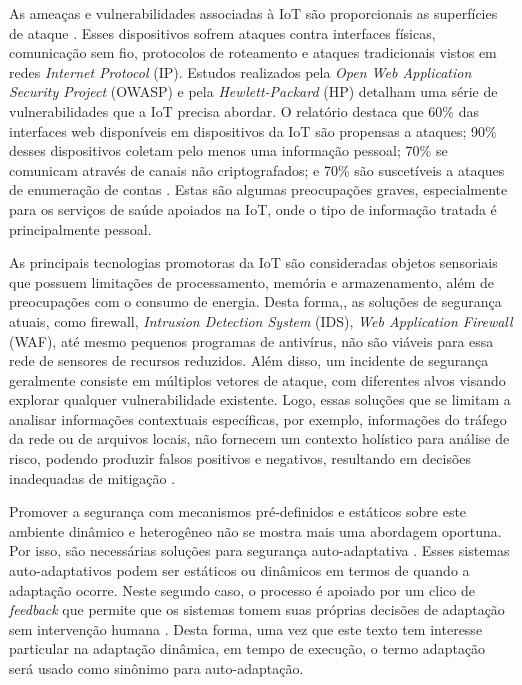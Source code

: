 \documentclass[tid,table]{texufpel} %
\newcommand {\AY} {\todo[inline, color=green]} %
\begin{document}
As ameaças e vulnerabilidades associadas à IoT são proporcionais as superfícies de ataque \cite{sans17}. Esses dispositivos sofrem ataques contra interfaces físicas, comunicação sem fio, protocolos de roteamento e ataques tradicionais vistos em redes \textit{Internet Protocol} (IP). Estudos realizados pela \textit{Open Web Application Security Project } (OWASP) e pela \textit{Hewlett-Packard} (HP) detalham uma série de vulnerabilidades que a IoT precisa abordar. O relatório destaca que 60\% das interfaces web disponíveis em dispositivos da IoT são propensas a ataques; 90\% desses dispositivos coletam pelo menos uma informação pessoal; 70\% se comunicam através de canais não criptografados; e 70\% são suscetíveis a ataques de enumeração de contas \cite{hpiot15, owaspiot18}. Estas são algumas preocupações graves, especialmente para os serviços de saúde apoiados na IoT, onde o tipo de informação tratada é principalmente pessoal.

As principais tecnologias promotoras da IoT são consideradas objetos sensoriais que possuem limitações de processamento, memória e armazenamento, além de preocupações com o consumo de energia. Desta forma,, as soluções de segurança atuais, como firewall, \textit{Intrusion Detection System} (IDS), \textit{Web Application Firewall} (WAF), até mesmo pequenos programas de antivírus, não são viáveis para essa rede de sensores de recursos reduzidos. Além disso, um incidente de segurança geralmente consiste em múltiplos vetores de ataque, com diferentes alvos visando explorar qualquer vulnerabilidade existente. Logo, essas soluções que se limitam a analisar informações contextuais específicas, por exemplo, informações do tráfego da rede ou de arquivos locais, não fornecem um contexto holístico para análise de risco, podendo produzir falsos positivos e negativos, resultando em decisões inadequadas de mitigação \cite{aman15}. 

Promover a segurança com mecanismos pré-definidos e estáticos sobre este ambiente dinâmico e heterogêneo não se mostra mais uma abordagem oportuna. Por isso, são necessárias soluções para segurança auto-adaptativa \cite{evesti13a}. Esses sistemas auto-adaptativos podem ser estáticos ou dinâmicos em termos de quando a adaptação ocorre. Neste segundo caso, o processo é apoiado por um clico de \textit{feedback} que permite que os sistemas tomem suas próprias decisões de adaptação sem intervenção humana \cite{lamprecht12}. Desta forma, uma vez que este texto tem interesse particular na adaptação dinâmica, em tempo de execução, o termo adaptação será usado como sinônimo para auto-adaptação.
\end{document}
